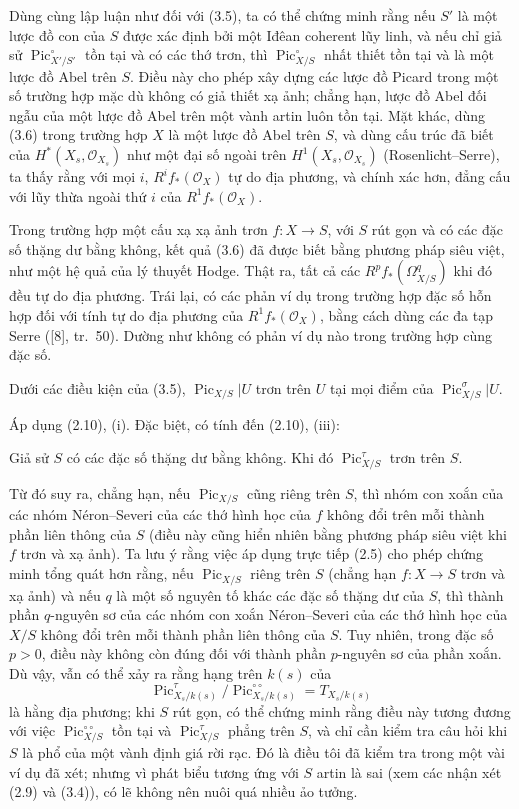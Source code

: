  Dùng cùng lập luận như đối với (3.5), ta có thể chứng
minh rằng nếu $S'$ là một lược đồ con của $S$ được xác định bởi một Iđêan
coherent lũy linh, và nếu chỉ giả sử $\operatorname{Pic}_{X'/S'}^\circ$ tồn
tại và có các thớ trơn, thì $\operatorname{Pic}_{X/S}^\circ$ nhất thiết tồn
tại và là một lược đồ Abel trên $S$. Điều này cho phép xây dựng các lược đồ
Picard trong một số trường hợp mặc dù không có giả thiết xạ ảnh; chẳng hạn,
lược đồ Abel đối ngẫu của một lược đồ Abel trên một vành artin luôn tồn tại.
Mặt khác, dùng (3.6) trong trường hợp $X$ là một lược đồ Abel trên $S$, và dùng
cấu trúc đã biết của $H^*(X_s,\mathcal O_{X_s})$ như một đại số ngoài trên
$H^1(X_s,\mathcal O_{X_s})$ (Rosenlicht--Serre), ta thấy rằng với mọi $i$,
$R^if_*(\mathcal O_X)$ tự do địa phương, và chính xác hơn, đẳng cấu với lũy
thừa ngoài thứ $i$ của $R^1f_*(\mathcal O_X)$.

 Trong trường hợp một cấu xạ xạ ảnh trơn
$f:X\longrightarrow S$, với $S$ rút gọn và có các đặc số thặng dư bằng không,
kết quả (3.6) đã được biết bằng phương pháp siêu việt, như một hệ quả của lý
thuyết Hodge. Thật ra, tất cả các $R^pf_*(\Omega^q_{X/S})$ khi đó đều tự do
địa phương. Trái lại, có các phản ví dụ
trong trường hợp đặc số hỗn hợp đối với tính tự do địa phương của
$R^1f_*(\mathcal O_X)$, bằng cách dùng các đa tạp Serre ([8], tr.~50). Dường
như không có phản ví dụ nào trong trường hợp cùng đặc số.

 Dưới các điều kiện của (3.5),
$\operatorname{Pic}_{X/S}|U$ trơn trên $U$ tại mọi điểm của
$\operatorname{Pic}_{X/S}^\sigma|U$.

Áp dụng (2.10), (i). Đặc biệt, có tính đến (2.10), (iii):

 Giả sử $S$ có các đặc số thặng dư bằng không. Khi đó
$\operatorname{Pic}_{X/S}^\tau$ trơn trên $S$.

 Từ đó suy ra, chẳng hạn, nếu
$\operatorname{Pic}_{X/S}$ cũng riêng trên $S$, thì nhóm con xoắn của các
nhóm Néron--Severi của các thớ hình học của $f$ không đổi trên mỗi thành phần
liên thông của $S$ (điều này cũng hiển nhiên bằng phương pháp siêu việt khi
$f$ trơn và xạ ảnh). Ta lưu ý rằng việc áp dụng trực tiếp (2.5) cho phép chứng
minh tổng quát hơn rằng, nếu $\operatorname{Pic}_{X/S}$ riêng trên $S$ (chẳng
hạn $f:X\longrightarrow S$ trơn và xạ ảnh) và nếu $q$ là một số nguyên tố
khác các đặc số thặng dư của $S$, thì thành phần $q$-nguyên sơ của các nhóm
con xoắn Néron--Severi của các thớ hình học của $X/S$ không đổi trên mỗi thành
phần liên thông của $S$. Tuy nhiên, trong đặc số $p>0$, điều này không còn đúng
đối với thành phần $p$-nguyên sơ của phần xoắn. Dù vậy, vẫn có thể xảy ra rằng
hạng trên $k(s)$ của
\[
\operatorname{Pic}_{X_s/k(s)}^\tau/
\operatorname{Pic}_{X_s/k(s)}^{\circ\circ}=T_{X_s/k(s)}
\]
là hằng địa phương; khi $S$ rút gọn, có thể chứng minh rằng điều này tương
đương với việc $\operatorname{Pic}_{X/S}^{\circ\circ}$ tồn tại và
$\operatorname{Pic}_{X/S}^\tau$ phẳng trên $S$, và chỉ cần kiểm tra câu hỏi
khi $S$ là phổ của một vành định giá rời rạc. Đó là điều tôi đã kiểm tra trong
một vài ví dụ đã xét; nhưng vì phát biểu tương ứng với $S$ artin là sai (xem
các nhận xét (2.9) và (3.4)), có lẽ không nên nuôi quá nhiều ảo tưởng.

